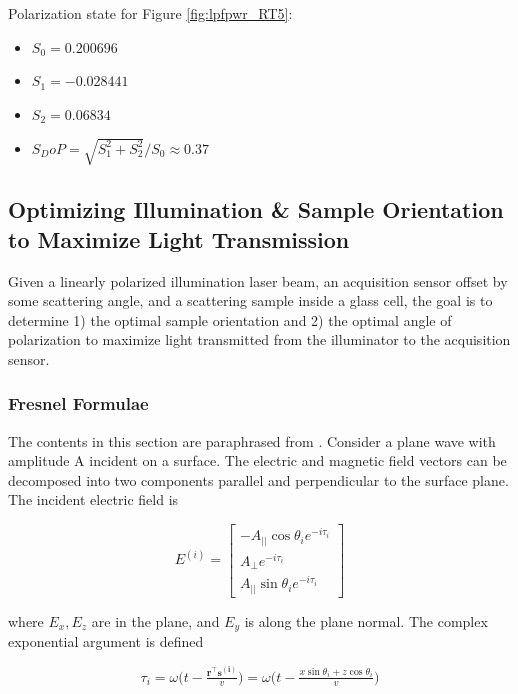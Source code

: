 Polarization state for Figure \ref{fig:lpfpwr_RT5}:
\begin{itemize}
    \item $S_0 = 0.200696$
    \item $S_1 = -0.028441$
    \item $S_2 = 0.06834$
    \item $S_DoP = \sqrt{S_1^2 + S_2^2}/S_0 \approx 0.37$
\end{itemize}


\subsection{Optimizing Illumination \& Sample Orientation to Maximize Light Transmission}
Given a linearly polarized illumination laser beam, an acquisition sensor offset by some scattering angle, and a scattering sample inside a glass cell, the goal is to determine 1) the optimal sample orientation and 2) the optimal angle of polarization to maximize light transmitted from the illuminator to the acquisition sensor.

\subsubsection{Fresnel Formulae}
The contents in this section are paraphrased from \cite{born2013principles}. Consider a plane wave with amplitude A incident on a surface. The electric and magnetic field vectors can be decomposed into two components parallel and perpendicular to the surface plane. The incident electric field is

\begin{equation}
    E^{(i)} = 
    \begin{bmatrix}
        -A_{||} \cos{\theta_i} e^{-i \tau_i} \\
        A_\perp e^{-i \tau_i} \\
        A_{||} \sin{\theta_i} e^{-i \tau_i}
    \end{bmatrix}
\end{equation}

where $E_x, E_z$ are in the plane, and $E_y$ is along the plane normal. The complex exponential argument is defined

\begin{equation}
    \tau_i = \omega \big( t - \tfrac{\mathbf{r}^\intercal \mathbf{s^{(i)}}}{v} \big) = \omega \big( t - \tfrac{x \sin{\theta_i} + z \cos{\theta_i}}{v} \big)
\end{equation}

